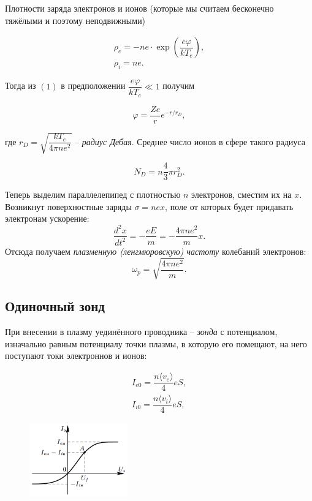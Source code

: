 \documentclass[a4paper]{article}
\theoremstyle{definition}
\theoremstyle{remark}
\begin{document}
Плотности заряда электронов и ионов (которые мы считаем бесконечно тяжёлыми и поэтому неподвижными)

\begin{equation}
\begin{array}{c}
    \rho_e = -ne \cdot \exp\left(\dfrac{e\varphi}{kT_e}\right),\\
    \rho_i = ne.
\end{array}
\end{equation}

Тогда из $(1)$ в предположении $\dfrac{e\varphi}{kT_e} \ll 1$ получим

\begin{equation}
    \varphi = \dfrac{Ze}{r}e^{-r/r_D},
\end{equation}

где $r_D = \sqrt{\dfrac{kT_e}{4\pi n e^2}}$ -- \textit{радиус Дебая}. Среднее число ионов в сфере такого радиуса 
  

\begin{equation}
    N_D = n\dfrac{4}{3}\pi r_D^2.
\end{equation}

Теперь выделим параллелепипед с плотностью $n$ электронов, сместим их на $x$. Возникнут поверхностные заряды $\sigma = nex$, поле от которых будет придавать электронам ускорение:
$$
\dfrac{d^2x}{dt^2}=-\dfrac{eE}{m}=-\dfrac{4\pi n e^2}{m}x.
$$ 
Отсюда получаем \textit{плазменную (ленгмюровскую) частоту} колебаний электронов:
\begin{equation}
\omega_p = \sqrt{\dfrac{4\pi ne^2}{m}}.
\end{equation}
 
\subsection{Одиночный зонд}

При внесении в плазму уединённого проводника -- \textit{зонда} с потенциалом, изначально равным потенциалу точки плазмы, в которую его помещают, на него поступают токи электроннов и ионов:

\begin{equation}
\begin{array}{c}
I_{e0} = \dfrac{n \langle v_e \rangle}{4}eS,\\
I_{i0} = \dfrac{n \langle v_i \rangle}{4}eS,
\end{array}
\end{equation}

\begin{figure}
    \centering
    \includegraphics[width = 120pt]{image/second.png}
\end{figure} 
\end{document}
